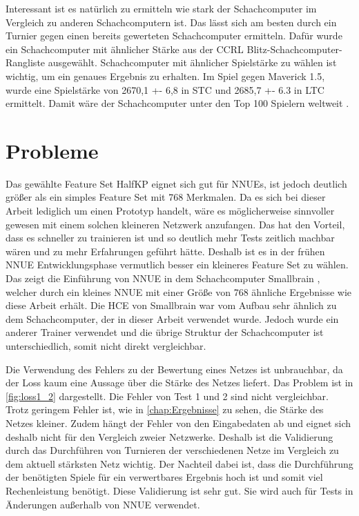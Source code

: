 Interessant ist es natürlich zu ermitteln wie stark der Schachcomputer im Vergleich zu anderen Schachcomputern ist. Das lässt sich am besten durch ein Turnier gegen einen bereits gewerteten Schachcomputer ermitteln. Dafür wurde ein Schachcomputer mit ähnlicher Stärke aus der \ac{CCRL} \cite{CCRL} Blitz-Schachcomputer-Rangliste ausgewählt. Schachcomputer mit ähnlicher Spielstärke zu wählen ist wichtig, um ein genaues Ergebnis zu erhalten. Im Spiel gegen Maverick 1.5, wurde eine Spielstärke von 2670,1 +- 6,8 in \ac{STC} und 2685,7 +- 6.3 in \ac{LTC} ermittelt. Damit wäre der Schachcomputer unter den Top 100 Spielern weltweit \cite{FIDERating}.

\section{Probleme}

Das gewählte Feature Set HalfKP eignet sich gut für \acp{NNUE}, ist jedoch deutlich größer als ein simples Feature Set mit 768 Merkmalen. Da es sich bei dieser Arbeit lediglich um einen Prototyp handelt, wäre es möglicherweise sinnvoller gewesen mit einem solchen kleineren Netzwerk anzufangen. Das hat den Vorteil, dass es schneller zu trainieren ist und so deutlich mehr Tests zeitlich machbar wären und zu mehr Erfahrungen geführt hätte. Deshalb ist es in der frühen \ac{NNUE} Entwicklungsphase vermutlich besser ein kleineres Feature Set zu wählen. Das zeigt die Einführung von \ac{NNUE} in dem Schachcomputer Smallbrain \cite{Smallbrain}, welcher durch ein kleines \ac{NNUE} mit einer Größe von 768 ähnliche Ergebnisse wie diese Arbeit erhält. Die \ac{HCE} von Smallbrain war vom Aufbau sehr ähnlich zu dem Schachcomputer, der in dieser Arbeit verwendet wurde. Jedoch wurde ein anderer Trainer verwendet und die übrige Struktur der Schachcomputer ist unterschiedlich, somit nicht direkt vergleichbar.

Die Verwendung des Fehlers zu der Bewertung eines Netzes ist unbrauchbar, da der Loss kaum eine Aussage über die Stärke des Netzes liefert. Das Problem ist in \autoref{fig:loss1_2} dargestellt. Die Fehler von Test 1 und 2 sind nicht vergleichbar. Trotz geringem Fehler ist, wie in \autoref{chap:Ergebnisse} zu sehen, die Stärke des Netzes kleiner. Zudem hängt der Fehler von den Eingabedaten ab und eignet sich deshalb nicht für den Vergleich zweier Netzwerke. Deshalb ist die Validierung durch das Durchführen von Turnieren der verschiedenen Netze im Vergleich zu dem aktuell stärksten Netz wichtig. Der Nachteil dabei ist, dass die Durchführung der benötigten Spiele für ein verwertbares Ergebnis hoch ist und somit viel Rechenleistung benötigt. Diese Validierung ist sehr gut. Sie wird auch für Tests in Änderungen außerhalb von \ac{NNUE} verwendet.

